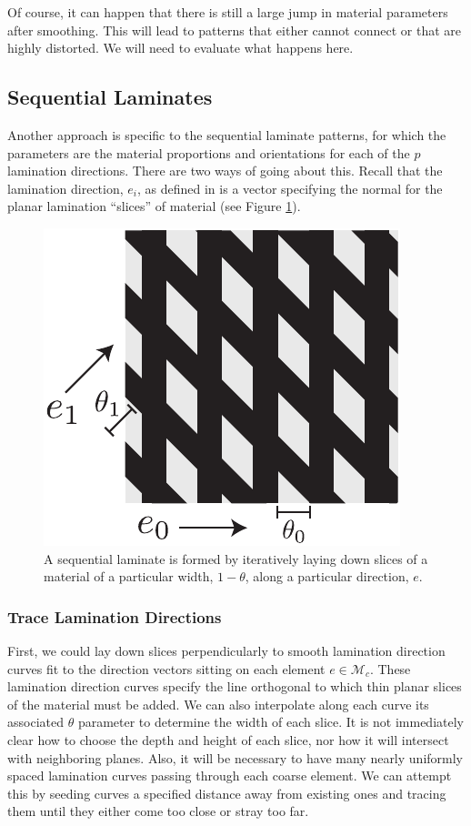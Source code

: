 \documentclass[10pt]{article}
\providecommand{\mesh}{\mathcal{M}}
\begin{document}
Of course, it can happen that there is still a large jump in material parameters
after smoothing. This will lead to patterns that either cannot connect or that
are highly distorted. We will need to evaluate what happens here.

\subsection{Sequential Laminates}
Another approach is specific to the sequential laminate patterns, for which the
parameters are the material proportions and orientations for each of the $p$
lamination directions. There are two ways of going about this.
Recall that the lamination direction, $e_i$, as defined in
\cite{allaire2002shape} is a vector specifying the normal for the planar
lamination ``slices'' of material (see Figure \ref{fig:sequential_laminate}).
\begin{figure}[h!]
    \centering
    \includegraphics[height=.3\textwidth]{images/sequential_laminates.pdf}
    \caption{A sequential laminate is formed by iteratively laying down slices
        of a material of a particular width, $1 - \theta$, along a particular
    direction, $e$.}
    \label{fig:sequential_laminate}
\end{figure}

\subsubsection{Trace Lamination Directions}
\label{sec:direction_trace}
First, we could lay down slices perpendicularly to smooth lamination direction
curves fit to the direction vectors sitting on each element $e \in \mesh_c$.
These lamination direction curves
specify the line orthogonal to which thin planar slices of the material must be
added. We can also interpolate along each curve its associated $\theta$
parameter to determine the width of each slice. It is not immediately clear how
to choose the depth and height of each slice, nor how it will intersect with
neighboring planes. Also, it will be necessary to have many nearly uniformly
spaced lamination curves passing through each coarse element. We can attempt
this by seeding curves a specified distance away from existing ones and tracing
them until they either come too close or stray too far.
\end{document}
